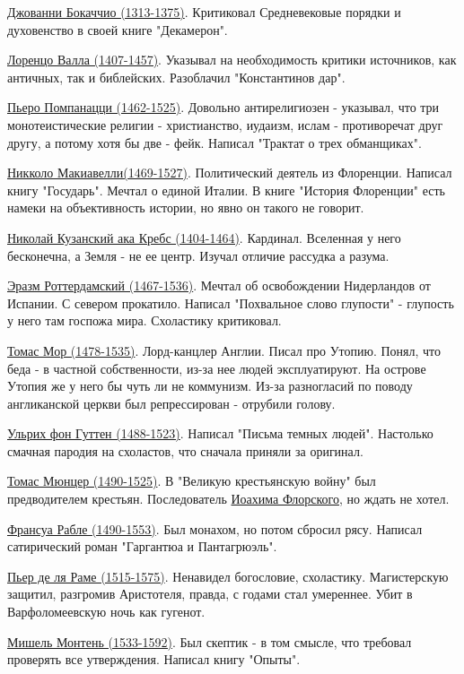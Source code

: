 \documentclass[12pt,a4paper]{article}
\begin{document}
\underline{Джованни Бокаччио (1313-1375)}. 
Критиковал Средневековые порядки и духовенство в своей книге "Декамерон". 

\underline{Лоренцо Валла (1407-1457)}. 
Указывал на необходимость критики источников, как античных, так и библейских. Разоблачил "Константинов дар".

\underline{Пьеро Помпанацци (1462-1525)}. Довольно антирелигиозен - указывал, что три монотеистические религии - христианство, иудаизм, ислам - противоречат друг другу, а потому хотя бы две -  фейк. Написал "Трактат о трех обманщиках".

\underline{Никколо Макиавелли(1469-1527)}. Политический деятель из Флоренции. Написал книгу "Государь". Мечтал о единой Италии. В книге "История Флоренции" есть намеки на объективность истории, но явно он такого не говорит.

\underline{Николай Кузанский ака Кребс (1404-1464)}. Кардинал. Вселенная у него бесконечна, а Земля - не ее центр. Изучал отличие рассудка а разума.

\underline{Эразм Роттердамский (1467-1536)}. Мечтал об освобождении Нидерландов от Испании. С севером прокатило. Написал "Похвальное слово глупости" - глупость у него там госпожа мира. Схоластику критиковал.

\underline{Томас Мор (1478-1535)}. Лорд-канцлер Англии. Писал про Утопию. Понял, что беда - в частной собственности, из-за нее людей эксплуатируют. На острове Утопия же у него бы чуть ли не коммунизм. Из-за разногласий по поводу англиканской церкви был репрессирован - отрубили голову.



\underline{Ульрих фон Гуттен (1488-1523)}. Написал "Письма темных людей". Настолько смачная пародия на схоластов, что сначала приняли за оригинал.

\underline{Томас Мюнцер (1490-1525)}. В "Великую крестьянскую войну" был предводителем крестьян. Последователь \underline{Иоахима Флорского}, но ждать не хотел.

\underline{Франсуа Рабле (1490-1553)}. Был монахом, но потом сбросил рясу. Написал сатирический роман "Гаргантюа и Пантагрюэль".

\underline{Пьер де ля Раме (1515-1575)}. Ненавидел богословие, схоластику. Магистерскую защитил, разгромив Аристотеля, правда, с годами стал умереннее. Убит в Варфоломеевскую ночь как гугенот.

\underline{Мишель Монтень (1533-1592)}. Был скептик - в том смысле, что требовал проверять все утверждения. Написал книгу "Опыты".
\end{document}
